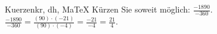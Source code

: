 \begin{MAufgabe}{Kuerzen}{kr, dh, MaTeX}
K\"urzen Sie soweit m\"oglich: $\frac{-1890}{-360}$.\\ 
\ifLsg\MLoesung
\quad $\frac{-1890}{-360}=\frac{(90)\cdot(-21)}{(90)\cdot(-4)}=\frac{-21}{-4}=\frac{21}{4}$.\else\relax\fi
 \end{MAufgabe}